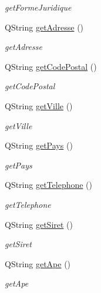 \begin{DoxyCompactItemize}
\begin{DoxyCompactList}\small\item\em get\+Forme\+Juridique \end{DoxyCompactList}\item 
Q\+String \mbox{\hyperlink{class_fournisseur_a8f14d2c643575cc8bc7ce836d5bfe9bf}{get\+Adresse}} ()
\begin{DoxyCompactList}\small\item\em get\+Adresse \end{DoxyCompactList}\item 
Q\+String \mbox{\hyperlink{class_fournisseur_ab8daa4a60b7a40af956e40492ed249b8}{get\+Code\+Postal}} ()
\begin{DoxyCompactList}\small\item\em get\+Code\+Postal \end{DoxyCompactList}\item 
Q\+String \mbox{\hyperlink{class_fournisseur_ad526bb60f5bb68e79499244c6e174ac3}{get\+Ville}} ()
\begin{DoxyCompactList}\small\item\em get\+Ville \end{DoxyCompactList}\item 
Q\+String \mbox{\hyperlink{class_fournisseur_a5004e3d9666618fce013b58ef93b0560}{get\+Pays}} ()
\begin{DoxyCompactList}\small\item\em get\+Pays \end{DoxyCompactList}\item 
Q\+String \mbox{\hyperlink{class_fournisseur_af30a747841b0e07ffe42be13ccdf9066}{get\+Telephone}} ()
\begin{DoxyCompactList}\small\item\em get\+Telephone \end{DoxyCompactList}\item 
Q\+String \mbox{\hyperlink{class_fournisseur_a4194cdab5ed4dbcf97ac63369fa2be8d}{get\+Siret}} ()
\begin{DoxyCompactList}\small\item\em get\+Siret \end{DoxyCompactList}\item 
Q\+String \mbox{\hyperlink{class_fournisseur_aa85152c3305393fe49ba6a1480fcfea0}{get\+Ape}} ()
\begin{DoxyCompactList}\small\item\em get\+Ape \end{DoxyCompactList}\end{DoxyCompactItemize}


